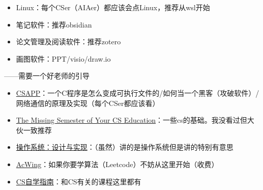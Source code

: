\documentclass{ctexbeamer} %
\begin{document}
\begin{frame}
	\begin{itemize}
		\item Linux：每个CSer（AIAer）都应该会点Linux，推荐从wsl开始
		\item 笔记软件：推荐obsidian
		\item 论文管理及阅读软件：推荐zotero
		\item 画图软件：PPT/visio/draw.io
	\end{itemize}
\end{frame}

\begin{frame}
	\begin{flushright}
		——需要一个好老师的引导
	\end{flushright}
	\begin{itemize}
		\item \href{https://www.bilibili.com/video/BV1iW411d7hd/}{CSAPP}：一个C程序是怎么变成可执行文件的/如何当一个黑客（攻破软件）/网络通信的原理及实现（每个CSer都应该看）
		\item \href{https://www.bilibili.com/video/BV1x7411H7wa/}{The Missing Semester of Your CS Education}：一些cs的基础。我没看过但大伙一致推荐
		\item \href{https://space.bilibili.com/202224425/channel/collectiondetail?sid=192498}{操作系统：设计与实现}：（虽然）讲的是操作系统但是讲的特别有意思
		\item \href{https://www.acwing.com/}{AcWing}：如果你要学算法（Leetcode）不妨从这里开始（收费）
		\item \href{https://csdiy.wiki/}{CS自学指南}：和CS有关的课程这里都有
	\end{itemize}
\end{frame}

{
}
\end{document}
